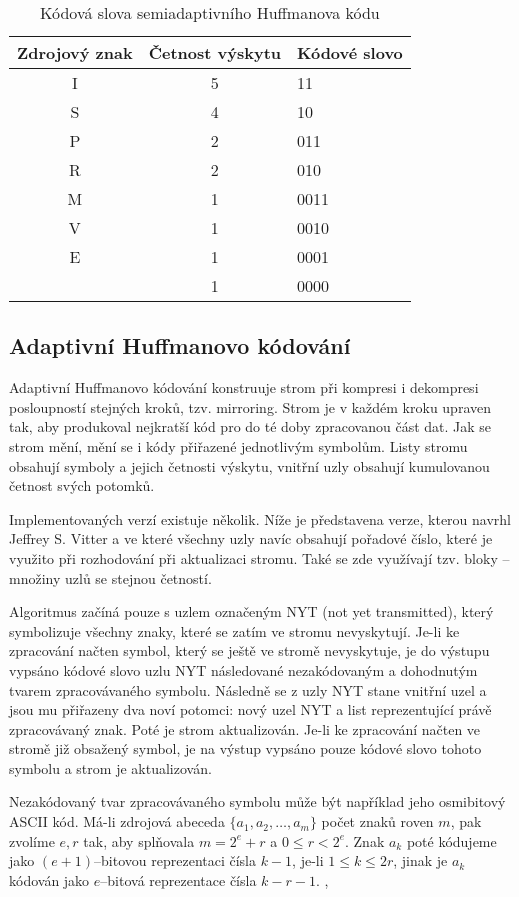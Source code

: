\begin{table}[!htb]
\centering
\begin{tabular}{|c|c|l|}
\hline
Zdrojový znak & Četnost výskytu & Kódové slovo\\
\hline
I & 5 & 11\\
S & 4 & 10\\
P & 2 & 011\\
R & 2 & 010\\
M & 1 & 0011\\
V & 1 & 0010\\
E & 1 & 0001\\
\textvisiblespace & 1 & 0000\\
\hline
\end{tabular}
\caption{Kódová slova semiadaptivního Huffmanova kódu}
\label{semiHuffmanTabulka}
\end{table}

\subsection{Adaptivní Huffmanovo kódování}
Adaptivní Huffmanovo kódování konstruuje strom při kompresi i dekompresi posloupností stejných kroků, tzv. mirroring. Strom je v každém kroku upraven tak, aby produkoval nejkratší kód pro do té doby zpracovanou část dat. Jak se strom mění, mění se i kódy přiřazené jednotlivým symbolům. Listy stromu obsahují symboly a jejich četnosti výskytu, vnitřní uzly obsahují kumulovanou četnost svých potomků.

Implementovaných verzí existuje několik. Níže je představena verze, kterou navrhl Jeffrey S. Vitter a ve které všechny uzly navíc obsahují pořadové číslo, které je využito při rozhodování při aktualizaci stromu. Také se zde využívají tzv. bloky -- množiny uzlů se stejnou četností.

Algoritmus začíná pouze s uzlem označeným NYT (not yet transmitted), který symbolizuje všechny znaky, které se zatím ve stromu nevyskytují. Je-li ke zpracování načten symbol, který se ještě ve stromě nevyskytuje, je do výstupu vypsáno kódové slovo uzlu NYT následované nezakódovaným a dohodnutým tvarem zpracovávaného symbolu. Následně se z uzly NYT stane vnitřní uzel a jsou mu přiřazeny dva noví potomci: nový uzel NYT a list reprezentující právě zpracovávaný znak. Poté je strom aktualizován. Je-li ke zpracování načten ve stromě již obsažený symbol, je na výstup vypsáno pouze kódové slovo tohoto symbolu a strom je aktualizován.

Nezakódovaný tvar zpracovávaného symbolu může být například jeho osmibitový ASCII kód. Má-li zdrojová abeceda $\{a_1, a_2, \ldots, a_m\}$ počet znaků roven $m$, pak zvolíme $e,r$ tak, aby splňovala $m= 2^e + r$ a $0 \leq r < 2^e$. Znak $a_k$ poté kódujeme jako $(e+1)$--bitovou reprezentaci čísla $k-1$, je-li $1 \leq k \leq 2r$, jinak je $a_k$ kódován jako $e$--bitová reprezentace čísla $k-r-1$. \cite{dataCompression}, \cite{introductionToDataCompression}

